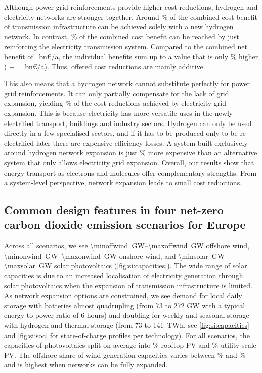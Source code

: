 Although power grid reinforcements provide higher cost reductions, hydrogen and
electricity networks are stronger together. Around \hyoftotalbenefit\% of the
combined cost benefit of transmission infrastructure can be achieved solely with
a new hydrogen network. In contrast, \acoftotalbenefit\% of the combined cost
benefit can be reached by just reinforcing the electricity transmission system.
Compared to the combined net benefit of \gridbenefitabs~bn\euro/a, the
individual benefits sum up to a value that is only \additivebenefitrel\% higher
(\maxacbenefitabs{} + \maxhybenefitabs{} = \additivebenefitabs{} bn\euro/a).
Thus, offered cost reductions are mainly additive.

This also means that a hydrogen network cannot substitute perfectly for power
grid reinforcements. It can only partially compensate for the lack of grid
expansion, yielding \benefithyofac\% of the cost reductions achieved by
electricity grid expansion. This is because electricity has more versatile uses
in the newly electrified transport, buildings and industry sectors. Hydrogen can
only be used directly in a few specialised sectors, and if it has to be produced
only to be re-electrified later there are expensive efficiency losses.  A system
built exclusively around hydrogen network expansion is just \acvshycost\% more
expensive than an alternative system that only allows electricity grid
expansion. Overall, our results show that energy transport as electrons and
molecules offer complementary strengths. From a system-level perspective,
network expansion leads to small cost reductions.

\subsection*{Common design features in four net-zero carbon dioxide emission scenarios for Europe}
\label{sec:es}

Across all scenarios, we see \SIrange{\minoffwind}{\maxoffwind}{\giga\watt}
offshore wind, \SIrange{\minonwind}{\maxonwind}{\giga\watt} onshore wind, and
\SIrange{\minsolar}{\maxsolar}{\giga\watt} solar photovoltaics
(\cref{fig:si:capacities}). The wide range of solar capacities is due to an
increased localisation of electricity generation through solar photovoltaics
when the expansion of transmission infrastructure is limited. As network
expansion options are constrained, we see demand for local daily storage with
batteries almost quadrupling (from 73 to 272 GW with a typical energy-to-power
ratio of 6 hours) and doubling for weekly and seasonal storage with hydrogen and
thermal storage (from 73 to 141~TWh, see \cref{fig:si:capacities} and
\cref{fig:si:soc} for state-of-charge profiles per technology). For all
scenarios, the capacities of photovoltaics split on average into
\meanrooftopshare\% rooftop PV and \meanutilityshare\% utility-scale PV. The
offshore share of wind generation capacities varies between \minoffshoreshare\%
and \maxoffshoreshare\% and is highest when networks can be fully expanded.


